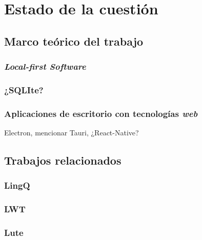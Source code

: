 \chapter{Estado de la cuestión}  

\section{Marco teórico del trabajo}

\subsection{\textit{Local-first Software}}
\parencite{Kleppmann}
\parencite{Kuhn}

\subsection{¿SQLIte?}

\subsection{Aplicaciones de escritorio con tecnologías \textit{web}}

Electron, mencionar Tauri, ¿React-Native?

\section{Trabajos relacionados}

\subsection{LingQ}

\subsection{LWT}

\subsection{Lute}
